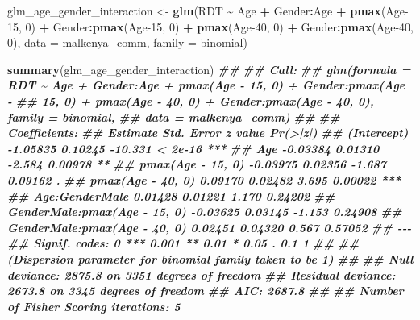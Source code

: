 \documentclass[
  letterpaper,
]{krantz}
\newenvironment{Shaded}{\begin{snugshade}}{\end{snugshade}}
\newcommand{\AttributeTok}[1]{\textcolor[rgb]{0.13,0.29,0.53}{#1}}
\newcommand{\DecValTok}[1]{\textcolor[rgb]{0.00,0.00,0.81}{#1}}
\newcommand{\DocumentationTok}[1]{\textcolor[rgb]{0.56,0.35,0.01}{\textbf{\textit{#1}}}}
\newcommand{\FunctionTok}[1]{\textcolor[rgb]{0.13,0.29,0.53}{\textbf{#1}}}
\newcommand{\NormalTok}[1]{#1}
\newcommand{\OtherTok}[1]{\textcolor[rgb]{0.56,0.35,0.01}{#1}}
\newcommand{\SpecialCharTok}[1]{\textcolor[rgb]{0.81,0.36,0.00}{\textbf{#1}}}
\begin{document}
\begin{Shaded}
\begin{Highlighting}[]
\NormalTok{glm\_age\_gender\_interaction }\OtherTok{\textless{}{-}} \FunctionTok{glm}\NormalTok{(RDT }\SpecialCharTok{\textasciitilde{}}\NormalTok{ Age }\SpecialCharTok{+}\NormalTok{ Gender}\SpecialCharTok{:}\NormalTok{Age }\SpecialCharTok{+} 
                                  \FunctionTok{pmax}\NormalTok{(Age}\DecValTok{{-}15}\NormalTok{, }\DecValTok{0}\NormalTok{) }\SpecialCharTok{+}\NormalTok{ Gender}\SpecialCharTok{:}\FunctionTok{pmax}\NormalTok{(Age}\DecValTok{{-}15}\NormalTok{, }\DecValTok{0}\NormalTok{) }\SpecialCharTok{+} 
                                  \FunctionTok{pmax}\NormalTok{(Age}\DecValTok{{-}40}\NormalTok{, }\DecValTok{0}\NormalTok{) }\SpecialCharTok{+}\NormalTok{ Gender}\SpecialCharTok{:}\FunctionTok{pmax}\NormalTok{(Age}\DecValTok{{-}40}\NormalTok{, }\DecValTok{0}\NormalTok{),}
                              \AttributeTok{data =}\NormalTok{ malkenya\_comm, }\AttributeTok{family =}\NormalTok{ binomial)}

\FunctionTok{summary}\NormalTok{(glm\_age\_gender\_interaction)}
\DocumentationTok{\#\# }
\DocumentationTok{\#\# Call:}
\DocumentationTok{\#\# glm(formula = RDT \textasciitilde{} Age + Gender:Age + pmax(Age {-} 15, 0) + Gender:pmax(Age {-} }
\DocumentationTok{\#\#     15, 0) + pmax(Age {-} 40, 0) + Gender:pmax(Age {-} 40, 0), family = binomial, }
\DocumentationTok{\#\#     data = malkenya\_comm)}
\DocumentationTok{\#\# }
\DocumentationTok{\#\# Coefficients:}
\DocumentationTok{\#\#                              Estimate Std. Error z value Pr(\textgreater{}|z|)    }
\DocumentationTok{\#\# (Intercept)                  {-}1.05835    0.10245 {-}10.331  \textless{} 2e{-}16 ***}
\DocumentationTok{\#\# Age                          {-}0.03384    0.01310  {-}2.584  0.00978 ** }
\DocumentationTok{\#\# pmax(Age {-} 15, 0)            {-}0.03975    0.02356  {-}1.687  0.09162 .  }
\DocumentationTok{\#\# pmax(Age {-} 40, 0)             0.09170    0.02482   3.695  0.00022 ***}
\DocumentationTok{\#\# Age:GenderMale                0.01428    0.01221   1.170  0.24202    }
\DocumentationTok{\#\# GenderMale:pmax(Age {-} 15, 0) {-}0.03625    0.03145  {-}1.153  0.24908    }
\DocumentationTok{\#\# GenderMale:pmax(Age {-} 40, 0)  0.02451    0.04320   0.567  0.57052    }
\DocumentationTok{\#\# {-}{-}{-}}
\DocumentationTok{\#\# Signif. codes:  0 \textquotesingle{}***\textquotesingle{} 0.001 \textquotesingle{}**\textquotesingle{} 0.01 \textquotesingle{}*\textquotesingle{} 0.05 \textquotesingle{}.\textquotesingle{} 0.1 \textquotesingle{} \textquotesingle{} 1}
\DocumentationTok{\#\# }
\DocumentationTok{\#\# (Dispersion parameter for binomial family taken to be 1)}
\DocumentationTok{\#\# }
\DocumentationTok{\#\#     Null deviance: 2875.8  on 3351  degrees of freedom}
\DocumentationTok{\#\# Residual deviance: 2673.8  on 3345  degrees of freedom}
\DocumentationTok{\#\# AIC: 2687.8}
\DocumentationTok{\#\# }
\DocumentationTok{\#\# Number of Fisher Scoring iterations: 5}
\end{Highlighting}
\end{Shaded}
\end{document}
